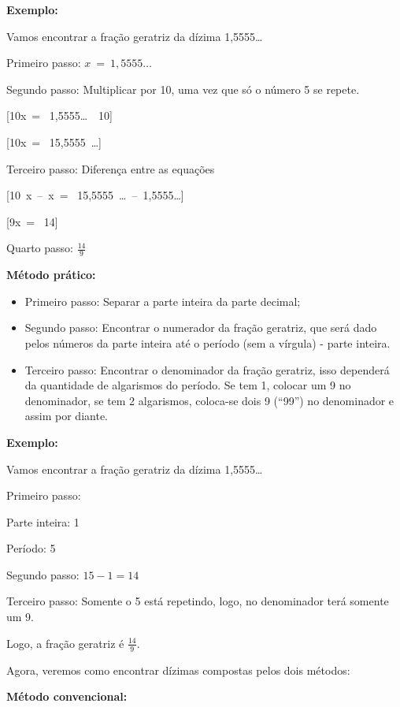 \textbf{Exemplo:}

Vamos encontrar a fração geratriz da dízima 1,5555\ldots{}

Primeiro passo: \(x\  = \ 1,5555\ldots\)

Segundo passo: Multiplicar por 10, uma vez que só o número 5 se repete.

[10x\  = \ 1,5555\ldots\  \times \ 10]

[10x\  = \ 15,5555\ \ldots]

Terceiro passo: Diferença entre as equações

[10\ x\ –\ x\  = \ 15,5555\ \ldots\ –\ 1,5555\ldots]

[9x\  = \ 14]

Quarto passo: \(\frac{14}{9}\)

\textbf{Método prático:}

\begin{itemize}
\item
  Primeiro passo: Separar a parte inteira da parte decimal;
\item
  Segundo passo: Encontrar o numerador da fração geratriz, que será dado
  pelos números da parte inteira até o período (sem a vírgula) - parte
  inteira.
\item
  Terceiro passo: Encontrar o denominador da fração geratriz, isso
  dependerá da quantidade de algarismos do período. Se tem 1, colocar um
  9 no denominador, se tem 2 algarismos, coloca-se dois 9 (``99'') no
  denominador e assim por diante.
\end{itemize}

\textbf{Exemplo:}

Vamos encontrar a fração geratriz da dízima 1,5555\ldots{}

Primeiro passo:

Parte inteira: 1

Período: 5

Segundo passo: \(15 - 1 = 14\)

Terceiro passo: Somente o 5 está repetindo, logo, no denominador terá
somente um 9.

Logo, a fração geratriz é \(\frac{14}{9}\).

Agora, veremos como encontrar dízimas compostas pelos dois métodos:

\textbf{Método convencional:}

